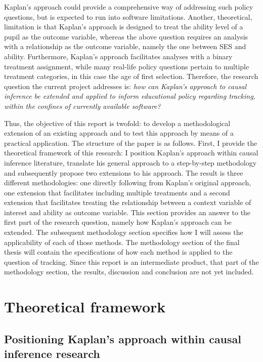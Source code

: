 \documentclass{article}
\begin{document}
Kaplan's approach could provide a comprehensive way of addressing such policy questions, but is expected to run into software limitations. Another, theoretical, limitation is that Kaplan's approach is designed to treat the ability level of a pupil as the outcome variable, whereas the above question requires an analysis with a relationship as the outcome variable, namely the one between SES and ability. Furthermore, Kaplan's approach facilitates analyses with a binary treatment assignment, while many real-life policy questions pertain to multiple treatment categories, in this case the age of first selection. 
Therefore, the research question the current project addresses is: \textit{how can Kaplan's approach to causal inference be extended and applied to inform educational policy regarding tracking, within the confines of currently available software?}

Thus, the objective of this report is twofold: to develop a methodological extension of an existing approach and to test this approach by means of a practical application. The structure of the paper is as follows. First, I provide the theoretical framework of this research: I position Kaplan's approach within causal inference literature, translate his general approach to a step-by-step methodology and subsequently propose two extensions to his approach. The result is three different methodologies: one directly following from Kaplan's original approach, one extension that facilitates including multiple treatments and a second extension that facilitates treating the relationship between a context variable of interest and ability as outcome variable. This section provides an answer to the first part of the research question, namely how Kaplan's approach can be extended. The subsequent methodology section specifies how I will assess the applicability of each of those methods. The methodology section of the final thesis will contain the specifications of how each method is applied to the question of tracking. Since this report is an intermediate product, that part of the methodology section, the results, discussion and conclusion are not yet included.

\section{Theoretical framework}
\subsection{Positioning Kaplan's approach within causal inference research} \label{translate}
\end{document}
